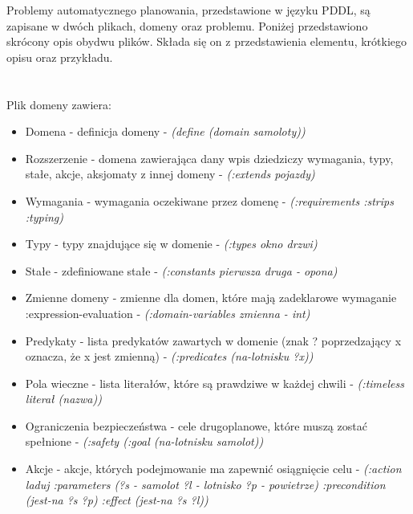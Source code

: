 Problemy automatycznego planowania, przedstawione w języku PDDL, są zapisane w dwóch plikach, domeny oraz problemu. Poniżej przedstawiono skrócony opis obydwu plików. Składa się on z przedstawienia elementu, krótkiego opisu oraz przykładu.
\\\\\\
Plik domeny zawiera:
  \begin{itemize}
\item Domena - definicja domeny - \textit{(define (domain samoloty))}
\item Rozszerzenie - domena zawierająca dany wpis dziedziczy wymagania, typy, stałe, akcje, aksjomaty z innej domeny - \textit{(:extends pojazdy) }
\item Wymagania - wymagania oczekiwane przez domenę - \textit{(:requirements :strips :typing)}
\item Typy - typy znajdujące się w domenie - \textit{(:types okno drzwi)}
\item Stałe - zdefiniowane stałe - \textit{(:constants pierwsza druga - opona)}
\item Zmienne domeny - zmienne dla domen, które mają zadeklarowe wymaganie :expression-evaluation - \textit{(:domain-variables zmienna - int)}
\item Predykaty - lista predykatów zawartych w domenie (znak ? poprzedzający x oznacza, że x jest zmienną) -  \textit{(:predicates (na-lotnisku ?x))}
\item Pola wieczne - lista literałów, które są prawdziwe w każdej chwili - \textit{(:timeless literał (nazwa))}
\item Ograniczenia bezpieczeństwa - cele drugoplanowe, które muszą zostać spełnione - \textit{(:safety (:goal (na-lotnisku samolot))}
\item Akcje - akcje, których podejmowanie ma zapewnić osiągnięcie celu - \textit{(:action laduj :parameters (?s - samolot ?l - lotnisko ?p - powietrze) :precondition (jest-na ?s ?p) :effect (jest-na ?s ?l)) }
\end{itemize}

